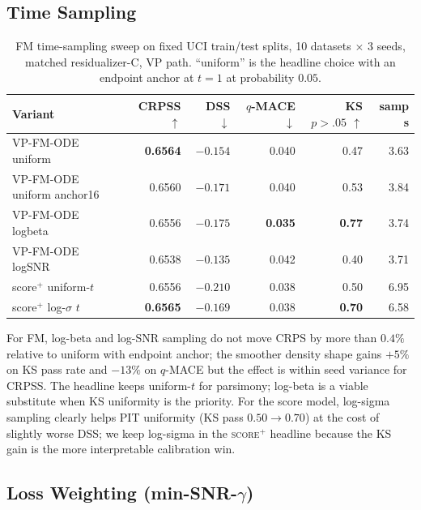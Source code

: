 \documentclass{tpm2026}
\begin{document}
\subsection{Time Sampling}\label{app:t-sampling}

\begin{table}[!h]
  \centering
  \caption{FM time-sampling sweep on fixed UCI train/test splits, 10 datasets $\times$ 3 seeds, matched residualizer-C, VP path. ``uniform'' is the headline choice with an endpoint anchor at $t=1$ at probability $0.05$.}\label{tab:t-sampling}
  \footnotesize
  \begin{tabular}{lrrrrr}
    \toprule
    Variant & CRPSS $\uparrow$ & DSS $\downarrow$ & $q$-MACE $\downarrow$ & KS $p{>}.05$ $\uparrow$ & samp s \\
    \midrule
    VP-FM-ODE uniform           & \textbf{0.6564} & $-0.154$ & 0.040 & 0.47 & 3.63 \\
    VP-FM-ODE uniform anchor16  & 0.6560 & \textbf{$-0.171$} & 0.040 & 0.53 & 3.84 \\
    VP-FM-ODE logbeta           & 0.6556 & $-0.175$ & \textbf{0.035} & \textbf{0.77} & 3.74 \\
    VP-FM-ODE logSNR            & 0.6538 & $-0.135$ & 0.042 & 0.40 & 3.71 \\
    \midrule
    score$^+$ uniform-$t$       & 0.6556 & \textbf{$-0.210$} & 0.038 & 0.50 & 6.95 \\
    score$^+$ log-$\sigma$ $t$  & \textbf{0.6565} & $-0.169$ & 0.038 & \textbf{0.70} & 6.58 \\
    \bottomrule
  \end{tabular}
\end{table}

For FM, log-beta and log-SNR sampling do not move CRPS by more than $0.4\%$ relative to uniform with endpoint anchor; the smoother density shape gains $+5\%$ on KS pass rate and $-13\%$ on $q$-MACE but the effect is within seed variance for CRPSS. The headline keeps uniform-$t$ for parsimony; log-beta is a viable substitute when KS uniformity is the priority. For the score model, log-sigma sampling clearly helps PIT uniformity (KS pass $0.50 \to 0.70$) at the cost of slightly worse DSS; we keep log-sigma in the \textsc{score$^+$} headline because the KS gain is the more interpretable calibration win.

\subsection{Loss Weighting (min-SNR-$\gamma$)}\label{app:loss-weighting}
\end{document}
